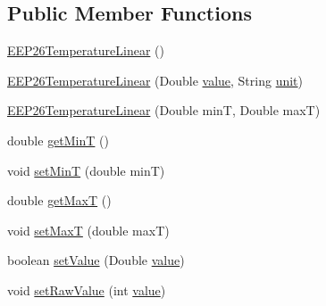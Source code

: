 \subsection*{Public Member Functions}
\begin{DoxyCompactItemize}
\item 
\hyperlink{classit_1_1polito_1_1elite_1_1enocean_1_1enj_1_1eep_1_1eep26_1_1attributes_1_1_e_e_p26_temperature_linear_a1abba92545048053de453ea9c7ddc6c0}{E\+E\+P26\+Temperature\+Linear} ()
\item 
\hyperlink{classit_1_1polito_1_1elite_1_1enocean_1_1enj_1_1eep_1_1eep26_1_1attributes_1_1_e_e_p26_temperature_linear_aab3b5e73c4e9268f6c88ced299c9d52c}{E\+E\+P26\+Temperature\+Linear} (Double \hyperlink{classit_1_1polito_1_1elite_1_1enocean_1_1enj_1_1eep_1_1_e_e_p_attribute_af4d7e34642004bb6ccfae51e925c983d}{value}, String \hyperlink{classit_1_1polito_1_1elite_1_1enocean_1_1enj_1_1eep_1_1_e_e_p_attribute_a3fe5b3d613c30066354ad66eeb23b8ae}{unit})
\item 
\hyperlink{classit_1_1polito_1_1elite_1_1enocean_1_1enj_1_1eep_1_1eep26_1_1attributes_1_1_e_e_p26_temperature_linear_adf34ac904b3745354e5a1cd247f47696}{E\+E\+P26\+Temperature\+Linear} (Double minT, Double maxT)
\item 
double \hyperlink{classit_1_1polito_1_1elite_1_1enocean_1_1enj_1_1eep_1_1eep26_1_1attributes_1_1_e_e_p26_temperature_linear_ae496007c1f9b7b447f80f49ae851f6cf}{get\+MinT} ()
\item 
void \hyperlink{classit_1_1polito_1_1elite_1_1enocean_1_1enj_1_1eep_1_1eep26_1_1attributes_1_1_e_e_p26_temperature_linear_aa8f79103f13140dfdd54e51b63d379e9}{set\+MinT} (double minT)
\item 
double \hyperlink{classit_1_1polito_1_1elite_1_1enocean_1_1enj_1_1eep_1_1eep26_1_1attributes_1_1_e_e_p26_temperature_linear_a1c07b9d37843a5b1b5f56e0d65d12930}{get\+MaxT} ()
\item 
void \hyperlink{classit_1_1polito_1_1elite_1_1enocean_1_1enj_1_1eep_1_1eep26_1_1attributes_1_1_e_e_p26_temperature_linear_a33126026f807471582efe08b36d65b11}{set\+MaxT} (double maxT)
\item 
boolean \hyperlink{classit_1_1polito_1_1elite_1_1enocean_1_1enj_1_1eep_1_1eep26_1_1attributes_1_1_e_e_p26_temperature_linear_ae73d89673eb89f6ca7b4ca7add357e87}{set\+Value} (Double \hyperlink{classit_1_1polito_1_1elite_1_1enocean_1_1enj_1_1eep_1_1_e_e_p_attribute_af4d7e34642004bb6ccfae51e925c983d}{value})
\item 
void \hyperlink{classit_1_1polito_1_1elite_1_1enocean_1_1enj_1_1eep_1_1eep26_1_1attributes_1_1_e_e_p26_temperature_linear_a905c13eac8a834051aff9f6a34f59ffa}{set\+Raw\+Value} (int \hyperlink{classit_1_1polito_1_1elite_1_1enocean_1_1enj_1_1eep_1_1_e_e_p_attribute_af4d7e34642004bb6ccfae51e925c983d}{value})

\end{DoxyCompactItemize}
